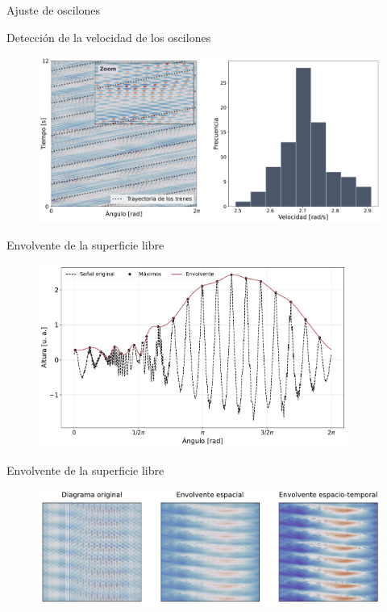 \documentclass[aspectratio=169]{beamer}
\begin{document}
\begin{frame}{Ajuste de oscilones}
\begin{minipage}{0.46\textwidth}
\begin{figure}
	  \end{figure}
	\end{minipage}
\end{frame}


\begin{frame}{Detección de la velocidad de los oscilones} %
	\begin{figure}
		\centering
		\includegraphics[width=\textwidth]{figs/velocidad_osc.pdf}
	\end{figure}
\end{frame}

\begin{frame}{Envolvente de la superficie libre} %
	\begin{figure}[ht]
		\includegraphics[width=0.9\textwidth]{figs/env_1sample.pdf}
	\end{figure}
\end{frame}

\begin{frame}{Envolvente de la superficie libre}
	\begin{figure}[ht]
		\centering
		\includegraphics[width=\textwidth]{figs/st_envelopes.pdf}
	\end{figure}
\end{frame}
\end{document}
